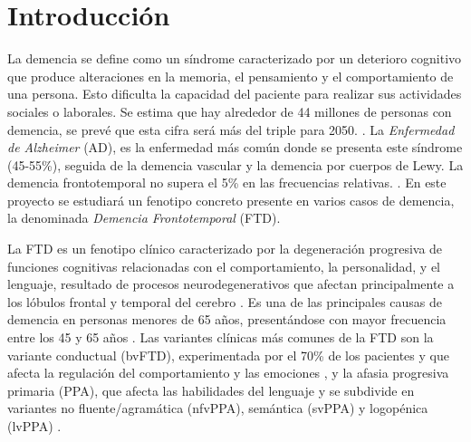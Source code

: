 \section{Introducción}

La demencia se define como un síndrome caracterizado por un deterioro cognitivo que produce alteraciones en la memoria, el pensamiento y el comportamiento de una persona. Esto dificulta la capacidad del paciente para realizar sus actividades sociales o laborales. \cite{Formiga2009} Se estima que hay alrededor de 44 millones de personas con demencia, se prevé que esta cifra será más del triple para 2050. \cite{Long2023}.
La \textit{Enfermedad de Alzheimer} (AD), es la enfermedad más común donde se presenta este síndrome (45-55\%), seguida de la demencia vascular y la demencia por cuerpos de Lewy. La demencia frontotemporal no supera el 5\% en las frecuencias relativas. \cite{GOODMAN201728, GarreOlmo2016}. En este proyecto se estudiará un fenotipo concreto presente en varios casos de demencia, la denominada \textit{Demencia Frontotemporal} (FTD).

La FTD es un fenotipo clínico caracterizado por la degeneración progresiva de funciones cognitivas relacionadas con el comportamiento, la personalidad, y el lenguaje, resultado de procesos neurodegenerativos que afectan principalmente a los lóbulos frontal y temporal del cerebro \cite{snowden2002frontotemporal, ratnavalli2002prevalence, piguet2011behavioural}. Es una de las principales causas de demencia en personas menores de 65 años, presentándose con mayor frecuencia entre los 45 y 65 años \cite{snowden2002frontotemporal,  ratnavalli2002prevalence}. Las variantes clínicas más comunes de la FTD son la variante conductual (bvFTD), experimentada por el 70\% de los pacientes y que afecta la regulación del comportamiento y las emociones \cite{snowden2002frontotemporal, piguet2011behavioural}, y la afasia progresiva primaria (PPA), que afecta las habilidades del lenguaje y se subdivide en variantes no fluente/agramática (nfvPPA), semántica (svPPA) y logopénica (lvPPA) \cite{gorno2011classification}.

